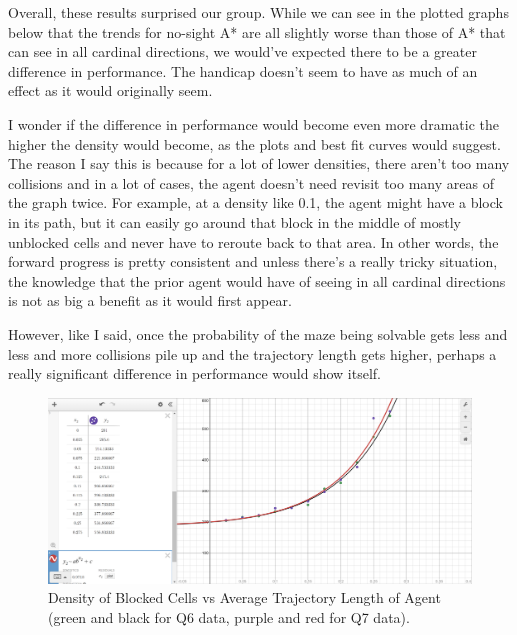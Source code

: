 \documentclass{homeworg}
\begin{document}
Overall, these results surprised our group. While we can see in the plotted graphs below that the trends for no-sight A* are all slightly worse than those of A* that can see in all cardinal directions, we would've expected there to be a greater difference in performance. The handicap doesn't seem to have as much of an effect as it would originally seem.

I wonder if the difference in performance would become even more dramatic the higher the density would become, as the plots and best fit curves would suggest. The reason I say this is because for a lot of lower densities, there aren't too many collisions and in a lot of cases, the agent doesn't need revisit too many areas of the graph twice. For example, at a density like 0.1, the agent might have a block in its path, but it can easily go around that block in the middle of mostly unblocked cells and never have to reroute back to that area. In other words, the forward progress is pretty consistent and unless there's a really tricky situation, the knowledge that the prior agent would have of seeing in all cardinal directions is not as big a benefit as it would first appear. 

However, like I said, once the probability of the maze being solvable gets less and less and more collisions pile up and the trajectory length gets higher, perhaps a really significant difference in performance would show itself.

\begin{figure}[h]
  	\centering
  	\includegraphics*[scale=0.3]{Q7 Density vs Avg Trajectory Length.png}
	\caption{Density of Blocked Cells vs Average Trajectory Length of Agent (green and black for Q6 data, purple and red for Q7 data).}
	\label{fig:example}
\end{figure}
\end{document}
